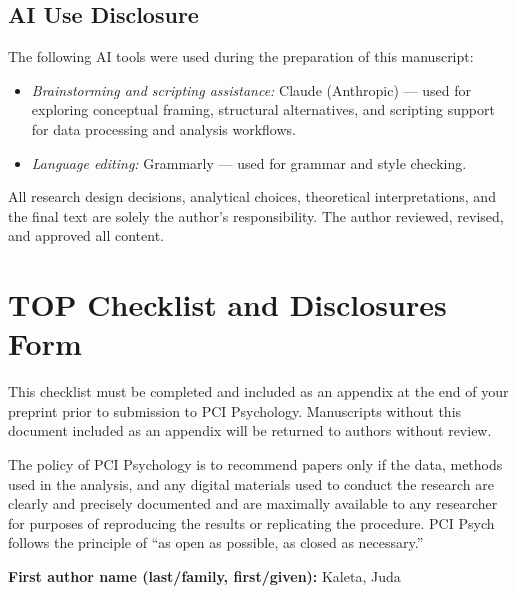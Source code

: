 \documentclass[
  12pt,
]{article}
\providecommand{\tightlist}{%
  \setlength{\itemsep}{0pt}\setlength{\parskip}{0pt}}
\providecommand{\DIFaddbegin}{} %
\providecommand{\DIFaddend}{} %
\providecommand{\DIFdelbegin}{} %
\providecommand{\DIFdelend}{} %
\begin{document}
\hypertarget{ai-use-disclosure}{%
\subsection{AI Use Disclosure}\label{ai-use-disclosure}}

The following AI tools were used during the preparation of this manuscript:

\begin{itemize}
\tightlist
\item
  \emph{Brainstorming and scripting assistance:} Claude (Anthropic) ---
  used for exploring conceptual framing, structural alternatives, and
  scripting support for data processing and analysis workflows.
\item
  \emph{Language editing:} Grammarly --- used for grammar and style
  checking.
\end{itemize}

All research design decisions, analytical choices, theoretical interpretations, and the final text are solely the author's responsibility. The author reviewed, revised, and approved all content.

\DIFdelbegin %
\DIFdelend \DIFaddbegin \printbibliography
\DIFaddend

\newpage

\hypertarget{top-checklist}{%
\section*{TOP Checklist and Disclosures Form}\label{top-checklist}}

This checklist must be completed and included as an appendix at the end of your preprint prior to submission to PCI Psychology. Manuscripts without this document included as an appendix will be returned to authors without review.

The policy of PCI Psychology is to recommend papers only if the data, methods used in the analysis, and any digital materials used to conduct the research are clearly and precisely documented and are maximally available to any researcher for purposes of reproducing the results or replicating the procedure. PCI Psych follows the principle of ``as open as possible, as closed as necessary.''

\bigskip

\textbf{First author name (last/family, first/given):} Kaleta, Juda
\end{document}
